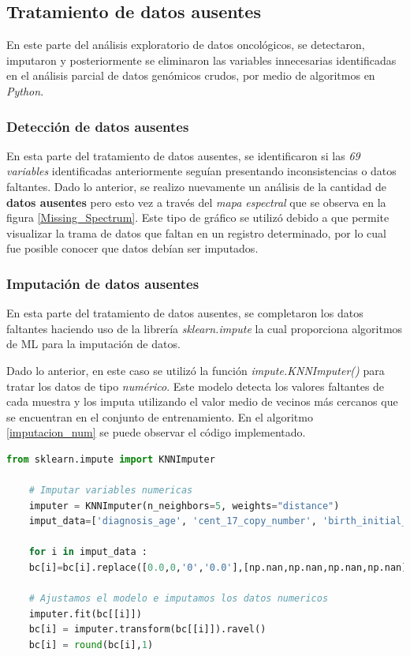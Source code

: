 \newpage
\subsection{Tratamiento de datos ausentes}
En este parte del análisis exploratorio de datos oncológicos, se detectaron, imputaron y posteriormente se eliminaron las variables innecesarias identificadas en el análisis parcial de datos genómicos crudos, por medio de algoritmos en \textit{Python}.

\subsubsection{Detección de datos ausentes}
En esta parte del tratamiento de datos ausentes, se identificaron si las \textit{69 variables} identificadas anteriormente seguían presentando inconsistencias o datos faltantes. Dado lo anterior, se realizo nuevamente un análisis de la cantidad de \textbf{datos ausentes} pero esto vez a través del \textit{mapa espectral} que se observa en la figura \ref{Missing_Spectrum}. Este tipo de gráfico se utilizó debido a que permite visualizar la trama de datos que faltan en un registro determinado, por lo cual fue posible conocer que datos debían ser imputados.

\subsubsection{Imputación de datos ausentes}
En esta parte del tratamiento de datos ausentes, se completaron los datos faltantes haciendo uso de la librería  \textit{sklearn.impute} la cual proporciona algoritmos de ML para la imputación de datos. 
 
Dado lo anterior, en este caso se utilizó la función \textit{impute.KNNImputer()} para tratar los datos de tipo \textit{numérico}. Este modelo detecta los valores faltantes de cada muestra y los imputa utilizando el valor medio de vecinos más cercanos que se encuentran en el conjunto de entrenamiento. En el algoritmo \ref{imputacion_num} se puede observar el código implementado.
 
 \begin{lstlisting}[basicstyle=\scriptsize,language=Python, label=imputacion_num, caption=Imputar datos numéricos con sklearn en Python.]
 	from sklearn.impute import KNNImputer
 	
 	# Imputar variables numericas
 	imputer = KNNImputer(n_neighbors=5, weights="distance")
	imput_data=['diagnosis_age', 'cent_17_copy_number', 'birth_initial_diagnosis', 'days_sample_collection', 'her_2_cent_17_ratio', 'disease_free_months', 'days_last_followup', 'year_initial_diagnosis', 'positive_lymph_hematoxylin', 'lymph_examined_number', 'mutation_count', 'overall_survival_months', 'tmb_nonsynonymous' ]
 	
 	for i in imput_data :
 	bc[i]=bc[i].replace([0.0,0,'0','0.0'],[np.nan,np.nan,np.nan,np.nan])
 	
 	# Ajustamos el modelo e imputamos los datos numericos
 	imputer.fit(bc[[i]])
 	bc[i] = imputer.transform(bc[[i]]).ravel()
 	bc[i] = round(bc[i],1)
 \end{lstlisting}
 

